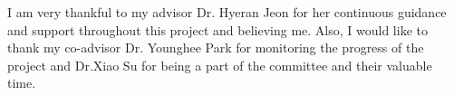 I am very thankful to my advisor Dr. Hyeran Jeon for her continuous guidance and support throughout this project and believing me. Also, I would like to thank my co-advisor Dr. Younghee Park for monitoring the progress of the project and Dr.Xiao Su for being a part of the committee and their valuable time.